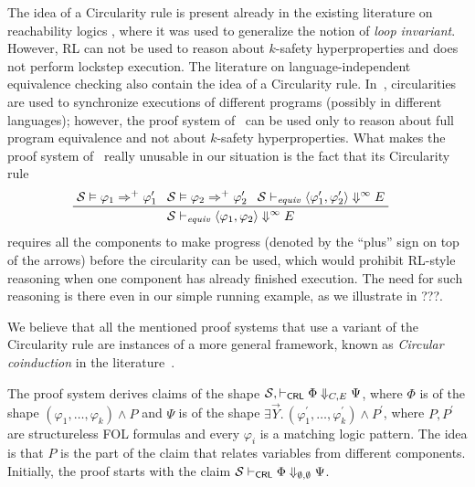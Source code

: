 The idea of a Circularity rule is present already 
in the existing literature on reachability logics \cite{RosuS12oopsla,RosuSCM13lics,StefanescuCMMSR19},
where it was used to generalize the notion of \emph{loop invariant}.
However, RL can not be used to reason about $k$-safety hyperproperties and does not perform lockstep execution.
The literature on language-independent equivalence checking also contain the idea of a Circularity rule.
In~\cite{CiobacaLRR16}, circularities are used to synchronize executions of different programs (possibly in different languages);
however, the proof system of~\cite{CiobacaLRR16} can be used only to reason about full program equivalence
and not about $k$-safety hyperproperties.
What makes the proof system of~\cite{CiobacaLRR16} really unusable in our situation is the fact that its
Circularity rule
\begin{align*}
  & \prftree[l]{}
    { \mathcal{S} \vDash \varphi_1 \Rightarrow^+ \varphi^\prime_1 }
    { \mathcal{S} \vDash \varphi_2 \Rightarrow^+ \varphi^\prime_2 }
    { \mathcal{S} \vdash_{\mathit{equiv}} \langle \varphi^\prime_1, \varphi^\prime_2 \rangle \Downarrow^{\infty} E}
    { \mathcal{S} \vdash_{\mathit{equiv}} \langle \varphi_1, \varphi_2 \rangle \Downarrow^{\infty} E}
\end{align*}
requires all the components to make progress (denoted by the ``plus'' sign on top of the arrows) before the circularity can be used,
which would prohibit RL-style reasoning when one component has already finished execution.
The need for such reasoning is there even in our simple running example, as we illustrate in ???.

We believe that all the mentioned proof systems that use a variant of the Circularity rule are instances of a more general
framework, known as \emph{Circular coinduction} in the literature~\cite{RosuL09CircularCoinduction}.


The proof system derives claims of the shape
$\mathcal{S}, \vdash_{\mathsf{CRL}} \Phi \Downarrow_{C,E} \Psi$,
where $\Phi$ is of the shape
$(\varphi_1, \ldots, \varphi_k) \land P$
and $\Psi$ is of the shape
$\exists \vec{Y}.\, (\varphi^\prime_1, \ldots, \varphi^\prime_k) \land P^\prime$,
where $P,P^\prime$ are structureless FOL formulas
and every $\varphi_i$ is a matching logic pattern.
The idea is that $P$ is the part of the claim that relates variables from different components.
Initially, the proof starts with the claim
$\mathcal{S} \vdash_{\mathsf{CRL}} \Phi \Downarrow_{\emptyset, \emptyset} \Psi$.


